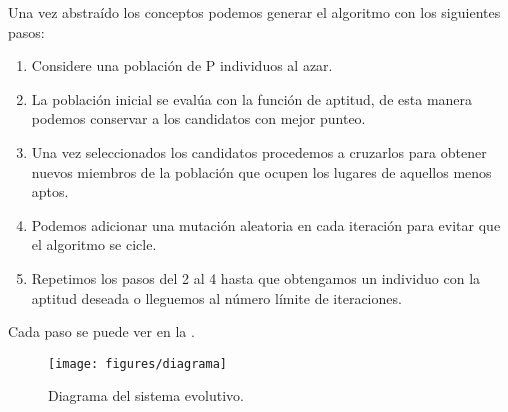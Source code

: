 \documentclass[10pt,twocolumn,a4paper]{articuloAPA}
\begin{document}

Una vez abstraído los conceptos podemos generar el algoritmo con los siguientes pasos:

\begin{enumerate}
  \item Considere una población de P individuos al azar.
  \item La población inicial se evalúa con la función de aptitud, de esta manera podemos conservar a los candidatos con mejor punteo.
  \item 	Una vez seleccionados los candidatos procedemos a cruzarlos para obtener nuevos miembros de la población que ocupen los lugares de aquellos menos aptos.
  \item Podemos adicionar una mutación aleatoria en cada iteración para evitar que el algoritmo se cicle.
  \item Repetimos los pasos del 2 al 4 hasta que obtengamos un individuo con la aptitud deseada o lleguemos al número límite de iteraciones.
\end{enumerate}

Cada paso se puede ver en la .

\begin{figure*}
  \centering
  \texttt{[image: figures/diagrama]}
  \decoRule
  \caption[Diagrama del sistema evolutivo. ]{Diagrama del sistema evolutivo.}
  \label{fig:diagrama}
\end{figure*}

\end{document}
